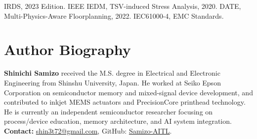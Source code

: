 \documentclass[conference]{IEEEtran}
\begin{document}
\begin{thebibliography}{1}
 IRDS, 2023 Edition.
 IEEE IEDM, TSV-induced Stress Analysis, 2020.
 DATE, Multi-Physics-Aware Floorplanning, 2022.
 IEC61000-4, EMC Standards.
\end{thebibliography}

\section*{Author Biography}
\noindent\textbf{Shinichi Samizo}
received the M.S. degree in Electrical and Electronic Engineering from Shinshu University, Japan.
He worked at Seiko Epson Corporation on semiconductor memory and mixed-signal device development, and contributed to inkjet MEMS actuators and PrecisionCore printhead technology.
He is currently an independent semiconductor researcher focusing on process/device education, memory architecture, and AI system integration.\\
\textbf{Contact:} \href{mailto:shin3t72@gmail.com}{shin3t72@gmail.com}, GitHub: \href{https://github.com/Samizo-AITL}{Samizo-AITL}.
\end{document}
